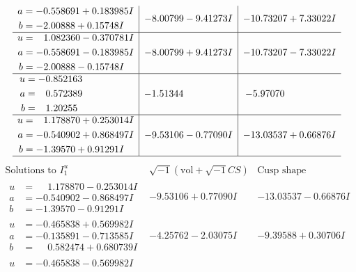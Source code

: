 \documentclass[1p]{elsarticle_modified}
\theoremstyle{definition}
\newcommand{\I}{\sqrt{-1}}
\begin{document}
$$\begin{array}{c|c|c}
\begin{aligned}
a &= -0.558691 + 0.183985 I \\
b &= -2.00888 + 0.15748 I\end{aligned}
 & -8.00799 - 9.41273 I & -10.73207 + 7.33022 I \\ \hline\begin{aligned}
u &= \phantom{-}1.082360 - 0.370781 I \\
a &= -0.558691 - 0.183985 I \\
b &= -2.00888 - 0.15748 I\end{aligned}
 & -8.00799 + 9.41273 I & -10.73207 - 7.33022 I \\ \hline\begin{aligned}
u &= -0.852163\phantom{ +0.000000I} \\
a &= \phantom{-}0.572389\phantom{ +0.000000I} \\
b &= \phantom{-}1.20255\phantom{ +0.000000I}\end{aligned}
 & -1.51344\phantom{ +0.000000I} & -5.97070\phantom{ +0.000000I} \\ \hline\begin{aligned}
u &= \phantom{-}1.178870 + 0.253014 I \\
a &= -0.540902 + 0.868497 I \\
b &= -1.39570 + 0.91291 I\end{aligned}
 & -9.53106 - 0.77090 I & -13.03537 + 0.66876 I\\
 \hline 
 \end{array}$$\newpage$$\begin{array}{c|c|c}  
\text{Solutions to }I^u_{1}& \I (\text{vol} + \sqrt{-1}CS) & \text{Cusp shape}\\
 \hline 
\begin{aligned}
u &= \phantom{-}1.178870 - 0.253014 I \\
a &= -0.540902 - 0.868497 I \\
b &= -1.39570 - 0.91291 I\end{aligned}
 & -9.53106 + 0.77090 I & -13.03537 - 0.66876 I \\ \hline\begin{aligned}
u &= -0.465838 + 0.569982 I \\
a &= -0.135891 - 0.713585 I \\
b &= \phantom{-}0.582474 + 0.680739 I\end{aligned}
 & -4.25762 - 2.03075 I & -9.39588 + 0.30706 I \\ \hline\begin{aligned}
u &= -0.465838 - 0.569982 I \\

\end{aligned}
\end{array}$$
\end{document}
